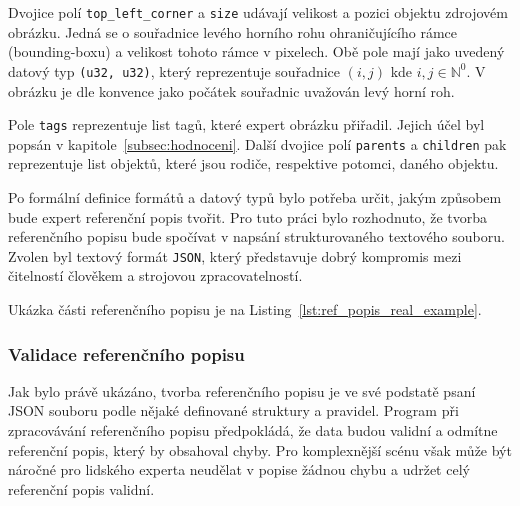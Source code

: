 Dvojice polí \texttt{top\_left\_corner} a \texttt{size} udávají velikost a pozici objektu zdrojovém obrázku.
Jedná se o souřadnice levého horního rohu ohraničujícího rámce (bounding-boxu) a velikost tohoto rámce v pixelech.
Obě pole mají jako uvedený datový typ \texttt{(u32, u32)}, který reprezentuje souřadnice $(i, j)$ kde $i,j \in \mathbb{N}^{0}$.
V obrázku je dle konvence jako počátek souřadnic uvažován levý horní roh.

Pole \texttt{tags} reprezentuje list tagů, které expert obrázku přiřadil.
Jejich účel byl popsán v kapitole~\ref{subsec:hodnoceni}.
Další dvojice polí \texttt{parents} a \texttt{children} pak reprezentuje list objektů, které jsou rodiče, respektive potomci, daného objektu.

Po formální definice formátů a datový typů bylo potřeba určit, jakým způsobem bude expert referenční popis tvořit.
Pro tuto práci bylo rozhodnuto, že tvorba referenčního popisu bude spočívat v napsání strukturovaného textového souboru.
Zvolen byl textový formát \texttt{JSON}, který představuje dobrý kompromis mezi čitelností člověkem a strojovou zpracovatelností.

Ukázka části referenčního popisu je na Listing~\ref{lst:ref_popis_real_example}.


\subsubsection{Validace referenčního popisu}
Jak bylo právě ukázáno, tvorba referenčního popisu je ve své podstatě psaní JSON souboru podle nějaké definované struktury a pravidel.
Program při zpracovávání referenčního popisu předpokládá, že data budou validní a odmítne referenční popis, který by obsahoval chyby.
Pro komplexnější scénu však může být náročné pro lidského experta neudělat v popise žádnou chybu a udržet celý referenční popis validní.

